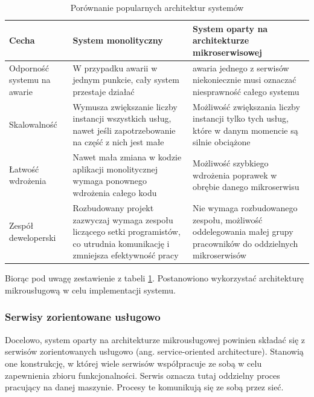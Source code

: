 \documentclass[11pt, a4]{article} %
\begin{document}
\begin{table}[!ht]
    \caption{Porównanie popularnych architektur systemów}
    \label{tab:porownanie-architektur}
    \begin{tabularx}{1\textwidth} { 
        | >{\raggedright\arraybackslash}X 
        | >{\centering\arraybackslash}X 
        | >{\raggedleft\arraybackslash}X | }
        \hline
       Cecha & System monolityczny & System oparty na architekturze mikroserwisowej \\
        \hline
       Odporność systemu na awarie & 
       W przypadku awarii w jednym punkcie, cały system przestaje działać & 
       awaria jednego z serwisów niekoniecznie musi oznaczać niesprawność całego systemu \\
       \hline
       Skalowalność & 
       Wymusza zwiększanie liczby instancji wszystkich usług, nawet jeśli zapotrzebowanie 
       na część z nich jest małe & 
       Możliwość zwiększania liczby instancji tylko tych usług, które w danym momencie są 
       silnie obciążone \\
      \hline
      Łatwość wdrożenia &
      Nawet mała zmiana w kodzie aplikacji monolitycznej wymaga ponownego wdrożenia całego 
      kodu &
      Możliwość szybkiego wdrożenia poprawek w obrębie danego mikroserwisu \\
      \hline
      Zespół deweloperski &
      Rozbudowany projekt zazwyczaj wymaga zespołu liczącego setki programistów, co 
      utrudnia komunikację i zmniejsza efektywność pracy &
      Nie wymaga rozbudowanego zespołu, możliwość oddelegowania małej grupy pracowników 
      do oddzielnych mikroserwisów \\
      \hline
    \end{tabularx}
\end{table}

Biorąc pod uwagę zestawienie z tabeli \ref{tab:porownanie-architektur}. Postanowiono wykorzystać architekturę 
mikrousługową w celu implementacji systemu.

\subsubsection{Serwisy zorientowane usługowo}

Docelowo, system oparty na architekturze mikrousługowej powinien składać się z serwisów 
zorientowanych usługowo (ang. service-oriented architecture). Stanowią one 
konstrukcję, w której wiele serwisów współpracuje ze sobą w celu zapewnienia zbioru 
funkcjonalności. Serwis oznacza tutaj oddzielny proces pracujący na danej maszynie. 
Procesy te komunikują się ze sobą przez sieć.
\end{document}
